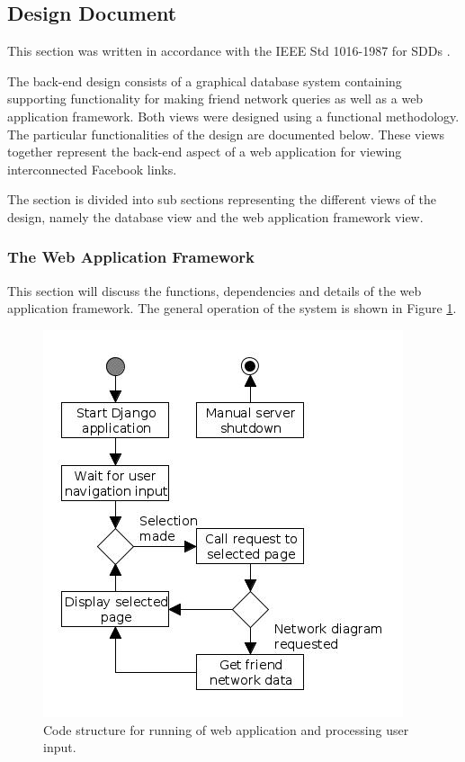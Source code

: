 \documentclass[12pt,onecolumn]{article}
\begin{document}
	\subsection{Design Document} %
	This section was written in accordance with the IEEE Std 1016-1987 for SDDs \cite{IEEE}. 
	
	The back-end design consists of a graphical database system containing supporting functionality for making friend network queries as well as a web application framework. Both views were designed using a functional methodology. The particular functionalities of the design are documented below. These views together represent the back-end aspect of a web application for viewing interconnected Facebook links.
	
	The section is divided into sub sections representing the different views of the design, namely the database view and the web application framework view.
	
	\subsubsection{The Web Application Framework}
	This section will discuss the functions, dependencies and details of the web application framework. The general operation of the system is shown in Figure \ref{fig:django}.
	
	\begin{figure}[h] 
		\centering
		\includegraphics[scale=1]{djangostruc}
		\caption{Code structure for running of web application and processing user input.} \label{fig:django}
	\end{figure}
	
\end{document}
